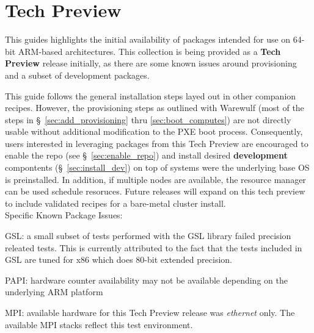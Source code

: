 \section{Tech Preview}

This guides highlights the initial availability of \OHPC{} packages intended
for use on 64-bit ARM-based architectures. This collection is being provided as
a {\bf Tech Preview} release initially, as there are some known issues around
provisioning and a subset of development packages.

This guide follows the general installation steps layed out in other companion
\OHPC{} recipes.  However, the provisioning steps as outlined with Warewulf
(most of the steps in \S~\ref{sec:add_provisioning} thru
\ref{sec:boot_computes}) are not directly usable without additional
modification to the PXE boot process.  Consequently, users interested in
leveraging packages from this Tech Preview are encouraged to enable the repo
(see \S~\ref{sec:enable_repo}) and install desired {\bf development}
compontents (\S~\ref{sec:install_dev}) on top of systems were the underlying
base OS is preinstalled. In addition, if multiple nodes are available, the
\rms{} resource manager can be used schedule resoruces. Future \OHPC{} releases
will expand on this tech preview to include validated recipes for a bare-metal
cluster install. \\

\noindent Specific Known Package Issues: 
\begin{itemize*}
\item GSL: a small subset of tests performed with the GSL library failed
  precision releated tests. This is currently attributed to the fact that the
  tests included in GSL are tuned for x86 which does 80-bit extended precision.
  \item PAPI: hardware counter availability may not be available depending on
    the underlying ARM platform
  \item MPI: available hardware for this Tech Preview release was {\em
    ethernet} only. The available MPI stacks reflect this test environment.
\end{itemize*}

